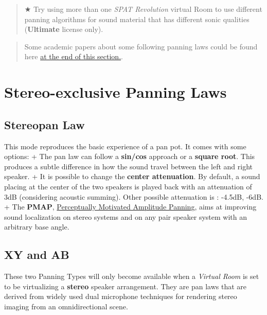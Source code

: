 \documentclass[
  letterpaper,
  DIV=11,
  numbers=noendperiod]{scrreport}
\begin{document}
\begin{quote}
★ Try using more than one \emph{SPAT Revolution} virtual Room to use
different panning algorithms for sound material that has different sonic
qualities (\textbf{Ultimate} license only).
\end{quote}

\begin{quote}
Some academic papers about some following panning laws could be found
here
\href{https://doc.flux.audio/\#/en_US/spat_revolution_doc/Spatialisation_Technology_Panning_Algorithms?id=related-papers}{at
the end of this section.}.
\end{quote}

\hypertarget{stereo-exclusive-panning-laws}{%
\section{Stereo-exclusive Panning
Laws}\label{stereo-exclusive-panning-laws}}

\hypertarget{stereopan-law}{%
\subsection{Stereopan Law}\label{stereopan-law}}

This mode reproduces the basic experience of a pan pot. It comes with
some options: + The pan law can follow a \textbf{sin/cos} approach or a
\textbf{square root}. This produces a subtle difference in how the sound
travel between the left and right speaker. + It is possible to change
the \textbf{center attenuation}. By default, a sound placing at the
center of the two speakers is played back with an attenuation of 3dB
(considering acoustic summing). Other possible attenuation is : -4.5dB,
-6dB. + The \textbf{PMAP},
\href{https://doc.flux.audio/\#/en_US/spat_revolution_doc/Spatialisation_Technology_Panning_Algorithms?id=PMAP}{Perceptually
Motivated Amplitude Panning}, aims at improving sound localization on
stereo systems and on any pair speaker system with an arbitrary base
angle.

\hypertarget{xy-and-ab}{%
\subsection{XY and AB}\label{xy-and-ab}}

These two Panning Types will only become available when a \emph{Virtual
Room} is set to be virtualizing a \textbf{stereo} speaker arrangement.
They are pan laws that are derived from widely used dual microphone
techniques for rendering stereo imaging from an omnidirectional scene.
\end{document}
